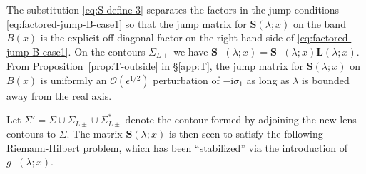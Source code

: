 \documentclass[12pt]{amsart}
\numberwithin{equation}{section}
\newcommand{\ii}{\mathrm{i}}
\newcommand{\SP}{\lambda}
\newcommand{\bigo}[1]{ \mathcal{O}\! \left( #1 \right) }
\begin{document}
The substitution \eqref{eq:S-define-3} separates the factors in the jump 
conditions \eqref{eq:factored-jump-B-case1} so that the jump matrix for 
$\mathbf{S}(\SP;x)$ on the band $B(x)$ is the  explicit off-diagonal factor on 
the right-hand side of \eqref{eq:factored-jump-B-case1}.  
On the contours $\Sigma_{L\pm}$ we have 
$\mathbf{S}_+(\SP;x)=\mathbf{S}_-(\SP;x)\mathbf{L}(\SP;x)$. From 
Proposition~\ref{prop:T-outside} in \S\ref{app:T}, the jump matrix for 
$\mathbf{S}(\SP;x)$ on $B(x)$ is uniformly an $\bigo{\epsilon^{1/2}}$ 
perturbation of $-\ii\sigma_1$ as long as $\SP$ is bounded away from the 
real axis.  

Let $\Sigma' = \Sigma \cup \Sigma_{L\pm} \cup \Sigma^*_{L\pm}$ denote the contour formed by adjoining the new lens contours to $\Sigma$.  The matrix $\mathbf{S}(\lambda;x)$ is then seen to satisfy the following Riemann-Hilbert problem, which has been ``stabilized'' via the introduction of $g^+(\lambda;x)$. 
\end{document}
